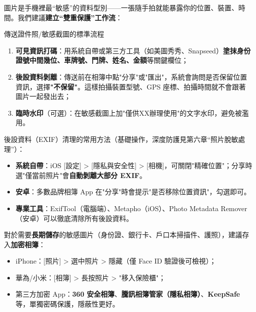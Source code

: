 
圖片是手機裡最“敏感”的資料型別——一張隨手拍就能暴露你的位置、裝置、時間。我們建議\textbf{建立“雙重保護”工作流}：

\begin{tcbwarn}{傳送證件照/敏感截圖的標準流程}
\begin{enumerate}
  \item \textbf{可見資訊打碼}：用系統自帶或第三方工具（如美圖秀秀、Snapseed）\textbf{塗抹身份證號中間幾位、車牌號、門牌、姓名、金額}等關鍵欄位；
  \item \textbf{後設資料剝離}：傳送前在相簿中點"分享"或"匯出"，系統會詢問是否保留位置資訊，選擇\textbf{"不保留"}。這樣拍攝裝置型號、GPS 座標、拍攝時間就不會跟著圖片一起發出去；
  \item \textbf{臨時水印}（可選）：在敏感截圖上加"僅供XX辦理使用"的文字水印，避免被濫用。
\end{enumerate}

\end{tcbwarn}

後設資料（EXIF）清理的常用方法（基礎操作，深度防護見第六章“照片脫敏處理”）：

\begin{itemize}
  \item \textbf{系統自帶}：iOS [設定] > [隱私與安全性] > [相機]，可關閉"精確位置"；分享時選"僅當前照片"會\textbf{自動剝離大部分 EXIF}。
  \item \textbf{安卓}：多數品牌相簿 App 在"分享"時會提示"是否移除位置資訊"，勾選即可。
  \item \textbf{專業工具}：ExifTool（電腦端）、Metapho（iOS）、Photo Metadata Remover（安卓）可以徹底清除所有後設資料。
\end{itemize}

對於需要\textbf{長期儲存}的敏感圖片（身份證、銀行卡、戶口本掃描件、護照），建議存入\textbf{加密相簿}：

\begin{itemize}
  \item iPhone：[照片] > 選中照片 > 隱藏（僅 Face ID 驗證後可檢視）；
  \item 華為/小米：[相簿] > 長按照片 > "移入保險櫃"；
  \item 第三方加密 App：\textbf{360 安全相簿}、\textbf{騰訊相簿管家（隱私相簿）}、\textbf{KeepSafe}等，單獨密碼保護，隱蔽性更好。
\end{itemize}
